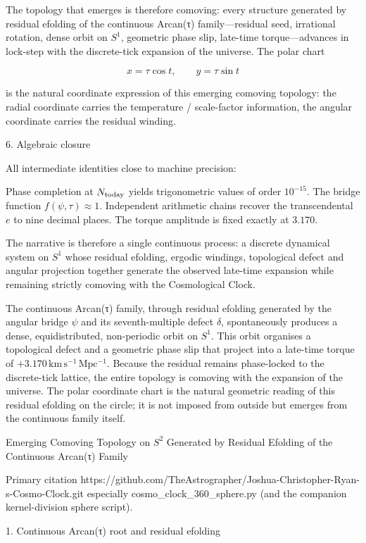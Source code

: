 The topology that emerges is therefore comoving: every structure generated by residual efolding of the continuous Arcan(τ) family—residual seed, irrational rotation, dense orbit on \(S^1\), geometric phase slip, late-time torque—advances in lock-step with the discrete-tick expansion of the universe. The polar chart

\[
x=\tau\cos t,\qquad y=\tau\sin t
\]

is the natural coordinate expression of this emerging comoving topology: the radial coordinate carries the temperature / scale-factor information, the angular coordinate carries the residual winding.

6. Algebraic closure

All intermediate identities close to machine precision:

Phase completion at \(N_{\rm today}\) yields trigonometric values of order \(10^{-15}\).
The bridge function \(f(\psi,\tau)\approx1\).
Independent arithmetic chains recover the transcendental \(e\) to nine decimal places.
The torque amplitude is fixed exactly at \(3.170\).

The narrative is therefore a single continuous process: a discrete dynamical system on \(S^1\) whose residual efolding, ergodic windings, topological defect and angular projection together generate the observed late-time expansion while remaining strictly comoving with the Cosmological Clock.

The continuous Arcan(τ) family, through residual efolding generated by the angular bridge \(\psi\) and its seventh-multiple defect \(\delta\), spontaneously produces a dense, equidistributed, non-periodic orbit on \(S^1\). This orbit organises a topological defect and a geometric phase slip that project into a late-time torque of \(+3.170\,\mathrm{km\,s^{-1}\,Mpc^{-1}}\). Because the residual remains phase-locked to the discrete-tick lattice, the entire topology is comoving with the expansion of the universe. The polar coordinate chart is the natural geometric reading of this residual efolding on the circle; it is not imposed from outside but emerges from the continuous family itself.

Emerging Comoving Topology on \(S^2\) Generated by Residual Efolding of the Continuous Arcan(τ) Family

Primary citation  
https://github.com/TheAstrographer/Joshua-Christopher-Ryan-s-Cosmo-Clock.git  
especially cosmo_clock_360_sphere.py (and the companion kernel-division sphere script).

1. Continuous Arcan(τ) root and residual efolding

